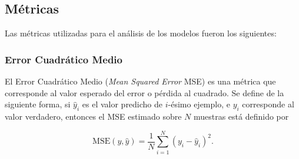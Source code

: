 \documentclass[spanish]{article}
\begin{document}
        
      \subsection{Métricas}
      
        Las métricas utilizadas para el análisis de los modelos fueron los siguientes:
        

          
        \subsubsection{Error Cuadrático Medio}
        
          El Error Cuadrático Medio (\emph{Mean Squared Error} MSE) es una métrica que corresponde al 
          valor esperado del error o pérdida al cuadrado. Se define de la siguiente forma, si $\hat{y}_i$ 
          es el valor predicho de $i$-ésimo ejemplo, e $y_i$ corresponde al valor verdadero, entonces
          el MSE estimado sobre $N$ muestras está definido por
          
          \begin{equation}
            \text{MSE}(y, \hat{y}) = \frac{1}{N} \sum_{i=1}^{N} (y_i - \hat{y}_i)^2.
          \end{equation}
\end{document}
